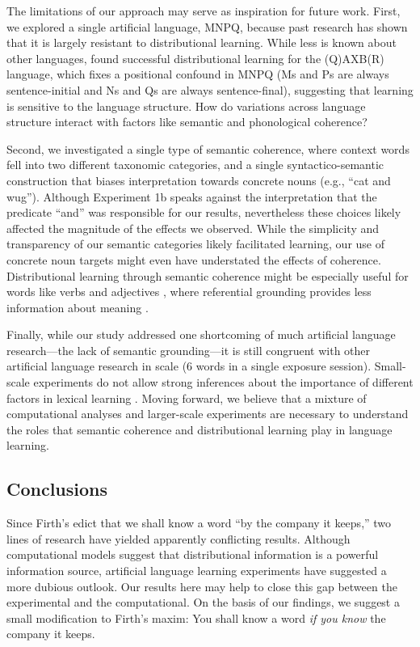 \documentclass[man,floatsintext]{apa6}
\begin{document}
The limitations of our approach may serve as inspiration for future work. First, we explored a single artificial language, MNPQ, because past research has shown that it is largely resistant to distributional learning. While less is known about other languages, \cite{reeder2009} found successful distributional learning for the (Q)AXB(R) language, which fixes a positional confound in MNPQ (Ms and Ps are always sentence-initial and Ns and Qs are always sentence-final), suggesting that learning is sensitive to the language structure. How do variations across language structure interact with factors like semantic and phonological coherence?

Second, we investigated a single type of semantic coherence, where context words fell into two different taxonomic categories, and a single syntactico-semantic construction that biases interpretation towards concrete nouns (e.g., ``cat and wug''). Although Experiment 1b speaks against the interpretation that the predicate ``and'' was responsible for our results, nevertheless these choices likely affected the magnitude of the effects we observed. While the simplicity and transparency of our semantic categories likely facilitated learning, our use of concrete noun targets might even have understated the effects of coherence. Distributional learning through semantic coherence might be especially useful for words like verbs and adjectives \citep{redington1998}, where referential grounding provides less information about meaning \citep{gleitman1990}.

Finally, while our study addressed one shortcoming of much artificial language research---the lack of semantic grounding---it is still congruent with other artificial language research in scale (6 words in a single exposure session). Small-scale experiments do not allow strong inferences about the importance of different factors in lexical learning \citep{romberg2010, frank2013}. Moving forward, we believe that a mixture of computational analyses and larger-scale experiments are necessary to understand the roles that semantic coherence and distributional learning play in language learning.

\subsection{Conclusions}

Since Firth's edict that we shall know a word ``by the company it keeps,'' two lines of research have yielded apparently conflicting results. Although computational models suggest that distributional information is a powerful information source, artificial language learning experiments have suggested a more dubious outlook. Our results here may help to close this gap between the experimental and the computational. On the basis of our findings, we suggest a small modification to Firth's maxim: You shall know a word \emph{if you know} the company it keeps.
\end{document}
